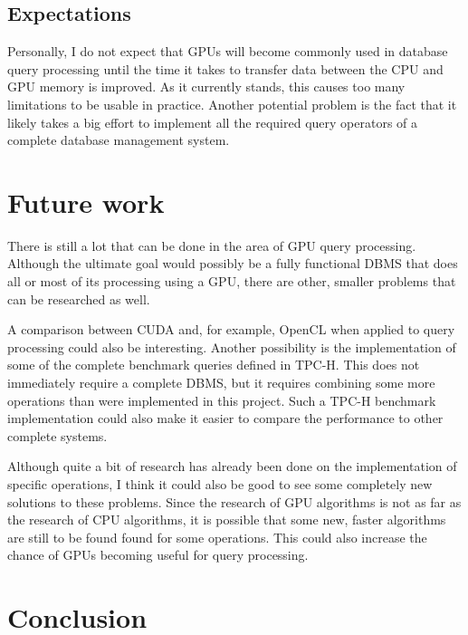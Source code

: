 \documentclass[a4paper,titlepage]{article}
\begin{document}
\subsection{Expectations}
Personally, I do not expect that GPUs will become commonly used in database query processing until the time it takes to transfer data between the CPU and GPU memory is improved. As it currently stands, this causes too many limitations to be usable in practice. Another potential problem is the fact that it likely takes a big effort to implement all the required query operators of a complete database management system.

\section{Future work}
There is still a lot that can be done in the area of GPU query processing. Although the ultimate goal would possibly be a fully functional DBMS that does all or most of its processing using a GPU, there are other, smaller problems that can be researched as well.

A comparison between CUDA and, for example, OpenCL when applied to query processing could also be interesting. Another possibility is the implementation of some of the complete benchmark queries defined in TPC-H. This does not immediately require a complete DBMS, but it requires combining some more operations than were implemented in this project. Such a TPC-H benchmark implementation could also make it easier to compare the performance to other complete systems.

Although quite a bit of research has already been done on the implementation of specific operations, I think it could also be good to see some completely new solutions to these problems. Since the research of GPU algorithms is not as far as the research of CPU algorithms, it is possible that some new, faster algorithms are still to be found found for some operations. This could also increase the chance of GPUs becoming useful for query processing.

\section{Conclusion}
\label{sec:conclusion}


{}

\end{document}
